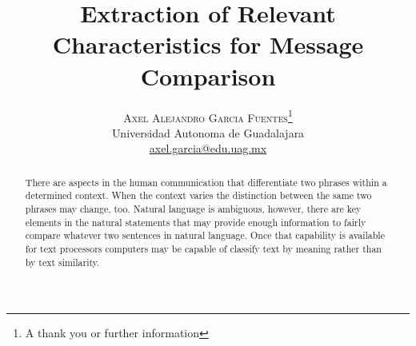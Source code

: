 \documentclass[twoside]{article}
\title{\vspace{-15mm}\fontsize{24pt}{10pt}\selectfont\textbf{Extraction of Relevant Characteristics for Message Comparison}} %
\author{
\large
\textsc{Axel Alejandro Garcia Fuentes}\thanks{A thank you or further information}\\[2mm] %
\normalsize Universidad Autonoma de Guadalajara \\ %
\normalsize \href{mailto:axel.garcia@edu.uag.mx}{axel.garcia@edu.uag.mx} %
\vspace{-5mm}
}
\date{}
\begin{document}
\maketitle %

\thispagestyle{fancy} %


\begin{abstract}

There are aspects in the human communication that differentiate two phrases within a determined context. When the context varies the distinction between the same two phrases may change, too. Natural language is ambiguous, however, there are key elements in the natural statements that may provide enough information to fairly compare whatever two sentences in natural language. Once that capability is available for text processors computers may be capable of classify text by meaning rather than by text similarity.

\end{abstract}

\end{document}
